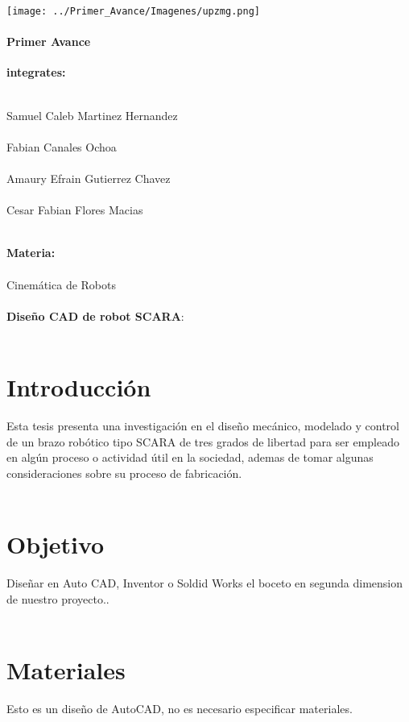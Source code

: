 \documentclass[10pt,a4paper]{article}
\begin{document}
\begin{center}
\texttt{[image: ../Primer\_Avance/Imagenes/upzmg.png]} 
\end{center}
\paragraph{\Huge Primer Avance} \textbf{\Huge integrates:} \\ \\
	\begin{Large}
		Samuel Caleb Martinez Hernandez\\ \\
		Fabian Canales Ochoa\\ \\
		Amaury Efrain Gutierrez Chavez\\ \\
		Cesar Fabian Flores Macias\\ \\
		\end{Large}
		
	
\textbf{\Huge Materia:}\\ \\
		{\Large Cinemática de Robots}\\ \\
	
{\Huge \textbf{Diseño CAD de robot SCARA}:}\\ \\
		
		
\section{Introducción}
{\Large Esta tesis presenta una investigación en el 			diseño mecánico, modelado y control de un 				brazo robótico tipo SCARA de tres grados de 			libertad para ser empleado en algún proceso o 			actividad útil en la sociedad, ademas de tomar 			algunas consideraciones sobre su proceso de 			fabricación.} \\ \\

\section{{\Huge Objetivo}}
{\Large Diseñar en Auto CAD, Inventor o Soldid Works el boceto en segunda dimension de nuestro proyecto..}\\ \\

\section{{\Huge Materiales}}
{\Large Esto es un diseño de AutoCAD, no es necesario especificar materiales.}\\ \\	
\end{document}
